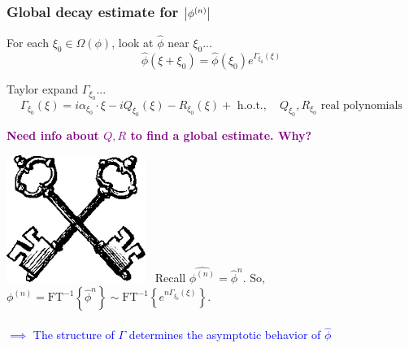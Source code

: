 \documentclass{beamer}
\theoremstyle{definition}
\begin{document}
\begin{frame}
\frametitle{Global decay estimate for $\abs{\phi^{(n)}}$}
For each $\xi_0\in \Omega(\phi)$, look at $\widehat{\phi}$ near $\xi_0$...
\begin{equation*}
\widehat{\phi}(\xi+\xi_0) = \widehat{\phi}(\xi_0) e^{\Gamma_{\xi_0}(\xi)}
\end{equation*}




Taylor expand $\Gamma_{\xi_0}$...
\begin{equation*}
\Gamma_{\xi_0}(\xi)=i\alpha_{\xi_0}\cdot\xi -iQ_{\xi_0}(\xi)  -R_{\xi_0}(\xi) + \text{ h.o.t.}, \quad Q_{\xi_0}, R_{\xi_0} \text{ real polynomials}
\end{equation*}

\begin{center}
	\textbf{\textcolor{purple}{Need info about $Q,R$ to find a global estimate. Why?}}
\end{center}





\includegraphics[scale=0.06]{key}$\,\,\,$ Recall $\widehat{\phi^{(n)}} = \widehat{\phi}^{n}$. So, $\phi^{(n)} = \text{FT}^{-1}\left\{ \widehat{\phi}^{n}  \right\} \sim \text{FT}^{-1}\left\{ e^{n\Gamma_{\xi_0}(\xi)} \right\}$.\\
$\,$\\



\textcolor{blue}{$\implies$ The structure of $\Gamma$ determines the asymptotic behavior of $\widehat{\phi}$} 
\end{frame}
\end{document}
